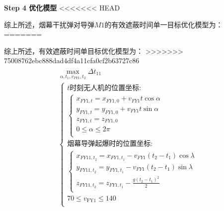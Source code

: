 \documentclass[../main.tex]{subfiles}
\begin{document}
\textbf{Step 4 优化模型}
<<<<<<< HEAD
\par 综上所述，烟幕干扰弹对导弹$M1$的有效遮蔽时间单一目标优化模型为：
=======
\par 综上所述，有效遮蔽时间单目标优化模型为：
>>>>>>> 75008762ebc888dad4df4a11cfa0cf2b63727c86
\begin{align}
  \begin{array}{c}
	\underset{\alpha ,t_1,v_{FY1},t_2}{\max}\Delta t_{11}
  \\
\left\{ \begin{array}{l}
	t\text{时刻无人机的位置坐标:}\\
	\left\{ \begin{array}{l}
	x_{FY1,t}=x_{FY1,0}+v_{FY1}t\cos \alpha \\
	y_{FY1,t}=y_{FY1,0}+v_{FY1}t\sin \alpha \\
	z_{FY1,t}=z_{FY1,0}\\
	0\leq \alpha \leq 2\pi \\
\end{array} \right.\\
	\text{烟幕导弹起爆时的位置坐标:}\\
	\left\{ \begin{array}{l}
	x_{FY11,t_2}=x_{FY1,t_1}-v_{FY1}\left( t_2-t_1 \right) \cos \lambda\\
	y_{FY11,t_2}=y_{FY1,t_1}-v_{FY1}\left( t_2-t_1 \right) \sin \lambda\\
	z_{FY11,t_2}=z_{FY1,t_1}-\frac{g\left( t_2-t_1 \right) ^2}{2}\\
\end{array} \right.\\
  70 \leq v_{\text{FY1}} \leq 140\\
\end{array} \right.  
\end{array}
\end{align}










  
\end{document}
